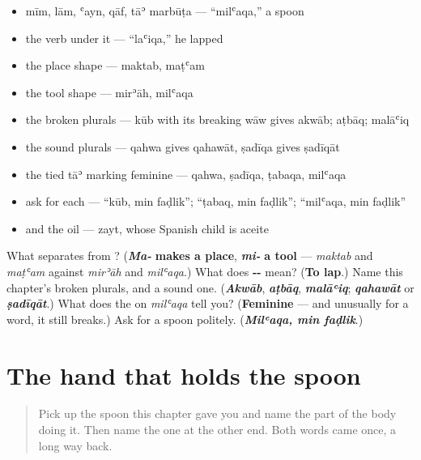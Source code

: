 \begin{itemize}
\raggedright
  \item mīm, lām, ʿayn, qāf, tāʾ marbūṭa — \textquotedblleft{}milʿaqa,\textquotedblright{} a spoon
  \item the verb under it — \textquotedblleft{}laʿiqa,\textquotedblright{} he lapped
  \item the place shape — maktab, maṭʿam
  \item the tool shape — mirʾāh, milʿaqa
  \item the broken plurals — kūb with its breaking wāw gives akwāb; aṭbāq; malāʿiq
  \item the sound plurals — qahwa gives qahawāt, ṣadīqa gives ṣadīqāt
  \item the tied tāʾ marking feminine — qahwa, ṣadīqa, ṭabaqa, milʿaqa
  \item ask for each — \textquotedblleft{}kūb, min faḍlik\textquotedblright{}; \textquotedblleft{}ṭabaq, min faḍlik\textquotedblright{}; \textquotedblleft{}milʿaqa, min faḍlik\textquotedblright{}
  \item and the oil — zayt, whose Spanish child is aceite
\end{itemize}

\begin{tcolorbox}[breakable,colback=teal!4,colframe=teal!35!black,title={Before you move on}]
What separates \textbf{} from \textbf{}? (\emph{\textbf{Ma-}} \textbf{makes a place}, \emph{\textbf{mi-}} \textbf{a tool} — \emph{maktab} and \emph{maṭʿam} against \emph{mirʾāh} and \emph{milʿaqa}.) What does \textbf{--} mean? (\textbf{To lap}.) Name this chapter's broken plurals, and a sound one. (\emph{\textbf{Akwāb}}, \emph{\textbf{aṭbāq}}, \emph{\textbf{malāʿiq}}; \emph{\textbf{qahawāt}} or \emph{\textbf{ṣadīqāt}}.) What does the \textbf{} on \emph{milʿaqa} tell you? (\textbf{Feminine} — and unusually for a \textbf{} word, it still breaks.) Ask for a spoon politely. (\emph{\textbf{Milʿaqa, min faḍlik}}.)
\end{tcolorbox}
\section[\texorpdfstring{\ar{يد} · \ar{أب} · \ar{أخت} (yad · ab · ukht)}{يد · أب · أخت (yad · ab · ukht)}]{The hand that holds the spoon}

\label{lesson:AR-R36-the-family-and-the-body-again}



\begin{quote}
Pick up the spoon this chapter gave you and name the part of the body doing it. Then name the one at the other end. Both words came once, a long way back.
\end{quote}

